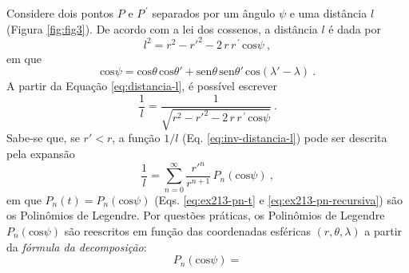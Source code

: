 \documentclass[10pt,a4paper,fleqn]{article}
\begin{document}
Considere dois pontos $P$ e $P^{\,\prime}$ separados por um ângulo $\psi$ e
uma distância $l$ (Figura \ref{fig:fig3}). De acordo com a lei dos cossenos,
a distância $l$ é dada por
\begin{equation}
l^{2} = r^{2} - r'^{2} - 2 \, r \, r^{\,\prime} \, \text{cos}\psi \: ,
\label{eq:distancia-l}
\end{equation}
em que
\begin{equation}
\text{cos}\psi = \text{cos}\theta \, \text{cos}\theta' + 
                 \text{sen}\theta \, \text{sen}\theta' \, \text{cos}(\lambda' - \lambda) \: .
\label{eq:cos-psi}
\end{equation}
A partir da Equação \ref{eq:distancia-l}, é possível escrever
\begin{equation}
\dfrac{1}{l} = \dfrac{1}{\sqrt{r^{2} - r'^{2} - 2 \, r \, r^{\,\prime} \, \text{cos}\psi}} \: .
\label{eq:inv-distancia-l}
\end{equation}
Sabe-se que, se $r' < r$, a função $1/l$ (Eq. \ref{eq:inv-distancia-l}) pode
ser descrita pela expansão
\begin{equation}
\dfrac{1}{l} = \sum_{n=0}^{\infty} \dfrac{r'^{n}}{r^{n+1}} \, P_{n}(\text{cos}\psi) \: ,
\label{eq:inv-distancia-l-Pn}
\end{equation}
em que $P_{n}(t) = P_{n}(\text{cos}\psi)$ (Eqs. \ref{eq:ex213-pn-t} e \ref{eq:ex213-pn-recursiva})
são os Polinômios de Legendre. Por questões práticas, os Polinômios de Legendre 
$P_{n}(\text{cos}\psi)$ são reescritos em função das coordenadas esféricas 
$(r, \theta, \lambda)$ a partir da \textit{fórmula da decomposição}:
\begin{equation}
P_{n}(\text{cos}\psi) = 
\label{eq:formula-decomposicao}
\end{equation}
\end{document}
